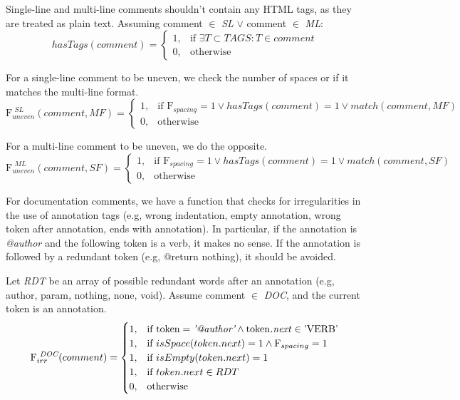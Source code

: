 \noindent Single-line and multi-line comments shouldn't contain any HTML tags, as they are treated as plain text.
Assuming comment $\in$ \textit{SL} $\vee$ comment $\in$ \textit{ML}:
\begin{equation*}
	hasTags(comment) = \begin{cases}
		1, & \text{if } \exists T \subset TAGS : T \in comment \\
		0, & \text{otherwise}
	\end{cases}
\end{equation*}

\noindent For a single-line comment to be uneven, we check the number of spaces or if it matches the multi-line format.
\begin{equation*}
	\mathrm{F}_{uneven}^{\textit{ SL}}(comment, MF) = \begin{cases}
		1, & \text{if } \mathrm{F}_{spacing} = 1 \vee hasTags(comment) = 1 \vee match(comment, MF) \\
		0, & \text{otherwise}
	\end{cases}
\end{equation*}

\noindent For a multi-line comment to be uneven, we do the opposite.
\begin{equation*}
	\mathrm{F}_{uneven}^{\textit{ ML}}(comment, SF) = \begin{cases}
		1, & \text{if } \mathrm{F}_{spacing} = 1 \vee hasTags(comment) = 1 \vee match(comment, SF) \\
		0, & \text{otherwise}
	\end{cases}
\end{equation*}

\noindent For documentation comments, we have a function that checks for irregularities in the use of annotation tags (e.g, wrong indentation, empty annotation, wrong token after annotation, ends with annotation). In particular, if the annotation is \textit{@author} and the following token is a verb, it makes no sense. If the annotation is followed by a redundant token (e.g, @return nothing), it should be avoided.

\noindent Let \textit{RDT} be an array of possible redundant words after an annotation (e.g, author, param, nothing, none, void).
Assume comment $\in$ \textit{DOC}, and the current token is an annotation.
\begin{equation*}
	\mathrm{F}_{irr}^{\textit{ DOC}}(comment) = \begin{cases}
		1, & \text{if } \text{token} = \textit{'@author'} \wedge \text{token\textit{.next}} \in \text{'VERB'} \\
		1, & \text{if } isSpace(token.next) = 1 \wedge \mathrm{F}_{spacing} = 1 \\
		1, & \text{if } isEmpty(token.next) = 1 \\
		1, & \text{if } token.next \in RDT \\
		0, & \text{otherwise}
	\end{cases}
\end{equation*}
